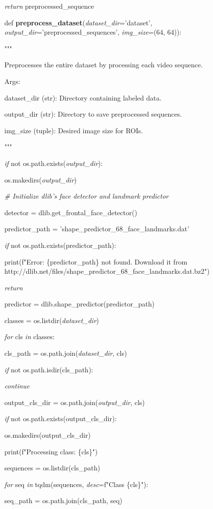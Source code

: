 \documentclass[
]{article}
\begin{document}
\emph{return} preprocessed\_sequence

def \textbf{preprocess\_dataset}(\emph{dataset\_dir}='dataset', \emph{output\_dir}='preprocessed\_sequences', \emph{img\_size}=(64, 64)):

"""

Preprocesses the entire dataset by processing each video sequence.

Args:

dataset\_dir (str): Directory containing labeled data.

output\_dir (str): Directory to save preprocessed sequences.

img\_size (tuple): Desired image size for ROIs.

"""

\emph{if} not os.path.exists(\emph{output\_dir}):

os.makedirs(\emph{output\_dir})

\emph{\# Initialize dlib's face detector and landmark predictor}

detector = dlib.get\_frontal\_face\_detector()

predictor\_path = 'shape\_predictor\_68\_face\_landmarks.dat'

\emph{if} not os.path.exists(predictor\_path):

print(f"Error: \{predictor\_path\} not found. Download it from http://dlib.net/files/shape\_predictor\_68\_face\_landmarks.dat.bz2")

\emph{return}

predictor = dlib.shape\_predictor(predictor\_path)

classes = os.listdir(\emph{dataset\_dir})

\emph{for} cls \emph{in} classes:

cls\_path = os.path.join(\emph{dataset\_dir}, cls)

\emph{if} not os.path.isdir(cls\_path):

\emph{continue}

output\_cls\_dir = os.path.join(\emph{output\_dir}, cls)

\emph{if} not os.path.exists(output\_cls\_dir):

os.makedirs(output\_cls\_dir)

print(f"Processing class: \{cls\}")

sequences = os.listdir(cls\_path)

\emph{for} seq \emph{in} tqdm(sequences, \emph{desc}=f"Class \{cls\}"):

seq\_path = os.path.join(cls\_path, seq)
\end{document}
